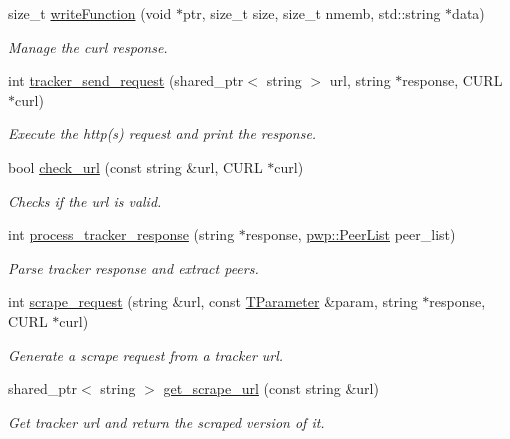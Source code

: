 \begin{DoxyCompactItemize}
size\+\_\+t \hyperlink{namespacetracker_a6486613c238a5415481c5ae6234aa91b}{write\+Function} (void $\ast$ptr, size\+\_\+t size, size\+\_\+t nmemb, std\+::string $\ast$data)
\begin{DoxyCompactList}\small\item\em Manage the curl response. \end{DoxyCompactList}\item 
int \hyperlink{namespacetracker_a53773ba678237b3a3675d87a66c68aee}{tracker\+\_\+send\+\_\+request} (shared\+\_\+ptr$<$ string $>$ url, string $\ast$response, C\+U\+RL $\ast$curl)
\begin{DoxyCompactList}\small\item\em Execute the http(s) request and print the response. \end{DoxyCompactList}\item 
bool \hyperlink{namespacetracker_a2ceea8b68053534e15cb3ac3fd1702fb}{check\+\_\+url} (const string \&url, C\+U\+RL $\ast$curl)
\begin{DoxyCompactList}\small\item\em Checks if the url is valid. \end{DoxyCompactList}\item 
int \hyperlink{namespacetracker_ac31ad1c263b18cd7885f587823514abe}{process\+\_\+tracker\+\_\+response} (string $\ast$response, \hyperlink{namespacepwp_ad07fa6df116b205302ad5ec172277184}{pwp\+::\+Peer\+List} peer\+\_\+list)
\begin{DoxyCompactList}\small\item\em Parse tracker response and extract peers. \end{DoxyCompactList}\item 
int \hyperlink{namespacetracker_afd84715185a5e4a1351b77af43e7e01c}{scrape\+\_\+request} (string \&url, const \hyperlink{structtracker_1_1TParameter}{T\+Parameter} \&param, string $\ast$response, C\+U\+RL $\ast$curl)
\begin{DoxyCompactList}\small\item\em Generate a scrape request from a tracker url. \end{DoxyCompactList}\item 
shared\+\_\+ptr$<$ string $>$ \hyperlink{namespacetracker_ace1983d55d0f9efca5948d0a69d25ba6}{get\+\_\+scrape\+\_\+url} (const string \&url)
\begin{DoxyCompactList}\small\item\em Get tracker url and return the scraped version of it. \end{DoxyCompactList}\item 

\end{DoxyCompactItemize}
